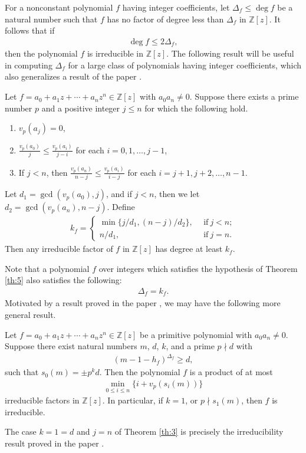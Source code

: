 \documentclass[12pt]{amsart}%
\begin{document}
For a nonconstant polynomial $f$ having integer coefficients, let $\Delta_f\leq \deg f$ be a natural number such that $f$ has no factor of degree less than $\Delta_f$ in $\mathbb{Z}[z]$. It follows that if
\begin{eqnarray*}
\deg f\leq 2\Delta_f,
\end{eqnarray*}
then the polynomial $f$ is irreducible in $\mathbb{Z}[z]$. The following result will be useful in computing $\Delta_f$ for a large class of polynomials having integer coefficients, which also generalizes a result of the paper \cite[Corollary~ 3.8]{Kh23}.
	\begin{theorem}\label{th:5}
		Let $f=a_0+a_1z+\cdots +a_nz^n \in \mathbb{Z}[z]$ with $a_0a_n\neq 0$. Suppose there exists a prime number  $p$ and a positive integer $j\leq n$ for which the following hold.
		\begin{enumerate}[label=$(\roman*)$]
			\item[$(i)$] $v_p(a_j)=0$,
			\item[$(ii)$] $\frac{v_p(a_0)}{j}\leq \frac{v_p(a_i)}{j-i}$ for each $i=0,1,\ldots,j-1$,
			\item[(iii)] If $j<n$, then $\frac{v_p(a_n)}{n-j} \leq \frac{v_p(a_i)}{i-j}$ for each $i=j+1,j+2,\ldots,n-1$.
		\end{enumerate}
Let $d_1=\gcd(v_p(a_0),j)$, and if $j<n$, then we let $d_2=\gcd(v_p(a_n),n-j)$. Define
\begin{eqnarray*}
k_f=\begin{cases}\min\{j/d_1, (n-j)/d_2\},~&~\text{if}~j<n;\\
n/d_1,~&~\text{if}~j=n.
\end{cases}
\end{eqnarray*}
		Then any irreducible factor of $f$ in $\mathbb{Z}[z]$ has degree at least $k_f$.
	\end{theorem}
Note that a polynomial $f$ over integers which satisfies the hypothesis of Theorem \ref{th:5} also satisfies the following:
\begin{eqnarray*}
\Delta_f=k_f.
\end{eqnarray*}
Motivated by a result proved in the paper \cite[Proposition 1]{JA}, we may have the following more general result.
\begin{theorem}\label{th:3}
Let $f=a_0+a_1z+ \cdots +a_nz^n \in \mathbb{Z}[z]$ be a primitive polynomial with $a_0a_n\neq 0$.  Suppose there exist natural numbers $m$, $d$, $k$, and a prime $p\nmid d$  with
\begin{eqnarray*}
(m-1-h_f)^{\Delta_f}\geq d,
\end{eqnarray*}
such that $s_0(m)=\pm p^kd$. Then  the polynomial $f$ is a product of at most
\begin{eqnarray*}
\min_{0\leq i\leq n}\{i+v_p(s_i(m))\}
\end{eqnarray*}
irreducible factors in $\mathbb{Z}[z]$. In particular, if $k=1$, or $p\nmid s_1(m)$, then $f$ is irreducible.
\end{theorem}
The case $k=1=d$ and $j=n$ of Theorem \ref{th:3} is precisely the irreducibility result proved in the paper \cite[Proposition 1]{JA}.
\end{document}
